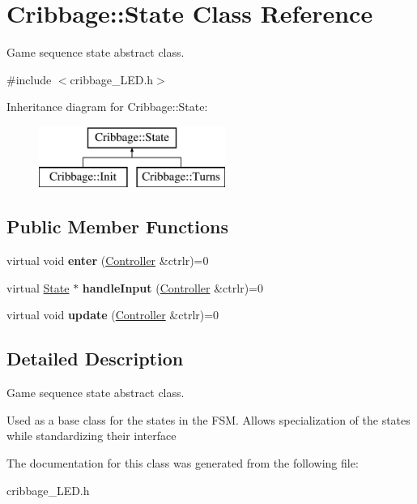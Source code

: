 \hypertarget{class_cribbage_1_1_state}{}\section{Cribbage\+:\+:State Class Reference}
\label{class_cribbage_1_1_state}


Game sequence state abstract class.  




{\ttfamily \#include $<$cribbage\+\_\+\+L\+E\+D.\+h$>$}

Inheritance diagram for Cribbage\+:\+:State\+:\begin{figure}[H]
\begin{center}
\leavevmode
\includegraphics[height=2.000000cm]{class_cribbage_1_1_state}
\end{center}
\end{figure}
\subsection*{Public Member Functions}
\begin{DoxyCompactItemize}
\item 
\mbox{\label{class_cribbage_1_1_state_af670b627a30cae912bde279f58b7e8e1}} 
virtual void {\bfseries enter} (\hyperlink{class_cribbage_1_1_controller}{Controller} \&ctrlr)=0
\item 
\mbox{\label{class_cribbage_1_1_state_a40c63cd7f9765daed9cca3dec9914ef9}} 
virtual \hyperlink{class_cribbage_1_1_state}{State} $\ast$ {\bfseries handle\+Input} (\hyperlink{class_cribbage_1_1_controller}{Controller} \&ctrlr)=0
\item 
\mbox{\label{class_cribbage_1_1_state_a625cb84913f9c379aa734206bd8b901a}} 
virtual void {\bfseries update} (\hyperlink{class_cribbage_1_1_controller}{Controller} \&ctrlr)=0
\end{DoxyCompactItemize}


\subsection{Detailed Description}
Game sequence state abstract class. 

Used as a base class for the states in the F\+SM. Allows specialization of the states while standardizing their interface 

The documentation for this class was generated from the following file\+:\begin{DoxyCompactItemize}
\item 
cribbage\+\_\+\+L\+E\+D.\+h\end{DoxyCompactItemize}
